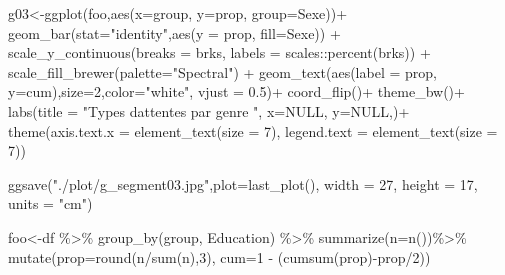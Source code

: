 \documentclass[
]{book}
\newenvironment{Shaded}{\begin{snugshade}}{\end{snugshade}}
\newcommand{\AttributeTok}[1]{\textcolor[rgb]{0.77,0.63,0.00}{#1}}
\newcommand{\ConstantTok}[1]{\textcolor[rgb]{0.00,0.00,0.00}{#1}}
\newcommand{\DecValTok}[1]{\textcolor[rgb]{0.00,0.00,0.81}{#1}}
\newcommand{\FloatTok}[1]{\textcolor[rgb]{0.00,0.00,0.81}{#1}}
\newcommand{\FunctionTok}[1]{\textcolor[rgb]{0.00,0.00,0.00}{#1}}
\newcommand{\NormalTok}[1]{#1}
\newcommand{\OtherTok}[1]{\textcolor[rgb]{0.56,0.35,0.01}{#1}}
\newcommand{\SpecialCharTok}[1]{\textcolor[rgb]{0.00,0.00,0.00}{#1}}
\newcommand{\StringTok}[1]{\textcolor[rgb]{0.31,0.60,0.02}{#1}}
\begin{document}
\begin{Shaded}
\begin{Highlighting}[]
\NormalTok{g03}\OtherTok{\textless{}{-}}\FunctionTok{ggplot}\NormalTok{(foo,}\FunctionTok{aes}\NormalTok{(}\AttributeTok{x=}\NormalTok{group, }\AttributeTok{y=}\NormalTok{prop, }\AttributeTok{group=}\NormalTok{Sexe))}\SpecialCharTok{+}
  \FunctionTok{geom\_bar}\NormalTok{(}\AttributeTok{stat=}\StringTok{"identity"}\NormalTok{,}\FunctionTok{aes}\NormalTok{(}\AttributeTok{y =}\NormalTok{ prop, }\AttributeTok{fill=}\NormalTok{Sexe)) }\SpecialCharTok{+} 
 \FunctionTok{scale\_y\_continuous}\NormalTok{(}\AttributeTok{breaks =}\NormalTok{ brks, }\AttributeTok{labels =}\NormalTok{ scales}\SpecialCharTok{::}\FunctionTok{percent}\NormalTok{(brks)) }\SpecialCharTok{+}
  \FunctionTok{scale\_fill\_brewer}\NormalTok{(}\AttributeTok{palette=}\StringTok{"Spectral"}\NormalTok{) }\SpecialCharTok{+} \FunctionTok{geom\_text}\NormalTok{(}\FunctionTok{aes}\NormalTok{(}\AttributeTok{label =}\NormalTok{ prop, }\AttributeTok{y=}\NormalTok{cum),}\AttributeTok{size=}\DecValTok{2}\NormalTok{,}\AttributeTok{color=}\StringTok{"white"}\NormalTok{, }\AttributeTok{vjust =} \FloatTok{0.5}\NormalTok{)}\SpecialCharTok{+}
  \FunctionTok{coord\_flip}\NormalTok{()}\SpecialCharTok{+}  \FunctionTok{theme\_bw}\NormalTok{()}\SpecialCharTok{+}
  \FunctionTok{labs}\NormalTok{(}\AttributeTok{title =} \StringTok{"Types d\textquotesingle{}attentes par genre "}\NormalTok{, }
       \AttributeTok{x=}\ConstantTok{NULL}\NormalTok{, }\AttributeTok{y=}\ConstantTok{NULL}\NormalTok{,)}\SpecialCharTok{+}
  \FunctionTok{theme}\NormalTok{(}\AttributeTok{axis.text.x =} \FunctionTok{element\_text}\NormalTok{(}\AttributeTok{size =} \DecValTok{7}\NormalTok{), }\AttributeTok{legend.text =} \FunctionTok{element\_text}\NormalTok{(}\AttributeTok{size =} \DecValTok{7}\NormalTok{))}

\FunctionTok{ggsave}\NormalTok{(}\StringTok{"./plot/g\_segment03.jpg"}\NormalTok{,}\AttributeTok{plot=}\FunctionTok{last\_plot}\NormalTok{(), }\AttributeTok{width =} \DecValTok{27}\NormalTok{, }\AttributeTok{height =} \DecValTok{17}\NormalTok{, }\AttributeTok{units =} \StringTok{"cm"}\NormalTok{)}

\NormalTok{foo}\OtherTok{\textless{}{-}}\NormalTok{df }\SpecialCharTok{\%\textgreater{}\%} 
  \FunctionTok{group\_by}\NormalTok{(group, Education) }\SpecialCharTok{\%\textgreater{}\%} 
   \FunctionTok{summarize}\NormalTok{(}\AttributeTok{n=}\FunctionTok{n}\NormalTok{())}\SpecialCharTok{\%\textgreater{}\%}
  \FunctionTok{mutate}\NormalTok{(}\AttributeTok{prop=}\FunctionTok{round}\NormalTok{(n}\SpecialCharTok{/}\FunctionTok{sum}\NormalTok{(n),}\DecValTok{3}\NormalTok{), }\AttributeTok{cum=}\DecValTok{1} \SpecialCharTok{{-}}\NormalTok{ (}\FunctionTok{cumsum}\NormalTok{(prop)}\SpecialCharTok{{-}}\NormalTok{prop}\SpecialCharTok{/}\DecValTok{2}\NormalTok{))}


\end{Highlighting}
\end{Shaded}
\end{document}
